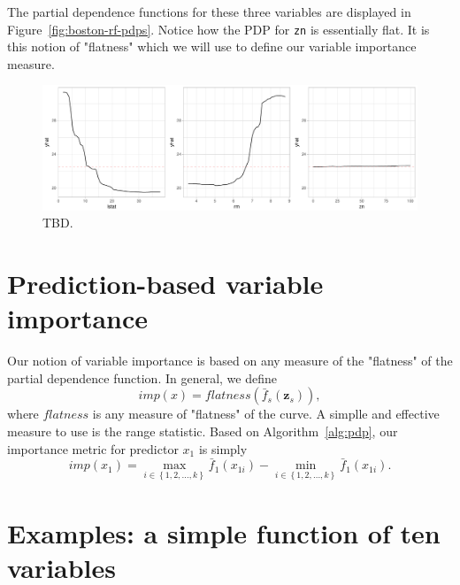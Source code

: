 \documentclass{article}
\def\code#1{\texttt{#1}}
\begin{document}
The partial dependence functions for these three variables are displayed in Figure~\ref{fig:boston-rf-pdps}. Notice how the PDP for \code{zn} is essentially flat. It is this notion of "flatness" which we will use to define our variable importance measure.
\begin{figure}[!htb]
  \label{boston-rf-pdps}
  \centering
  \includegraphics[width=1.0\textwidth]{boston-rf-pdps}
  \caption{TBD.}
\end{figure}


\section{Prediction-based variable importance}

Our notion of variable importance is based on any measure of the "flatness" of the partial dependence function. In general, we define
\begin{equation}
  imp\left(x\right) = flatness\left(\bar{f}_s\left(\boldsymbol{z}_s\right)\right),
\end{equation}
where $flatness$ is any measure of "flatness" of the curve. A simplle and effective measure to use is the range statistic. Based on Algorithm~\ref{alg:pdp}, our importance metric for predictor $x_1$ is simply
\begin{equation}
  imp\left(x_1\right) = \max_{i \in \left\{1, 2, \dots, k\right\}} \bar{f}_1\left(x_{1i}\right) - \min_{i \in \left\{1, 2, \dots, k\right\}} \bar{f}_1\left(x_{1i}\right).
\end{equation}


\section{Examples: a simple function of ten variables}
\end{document}
